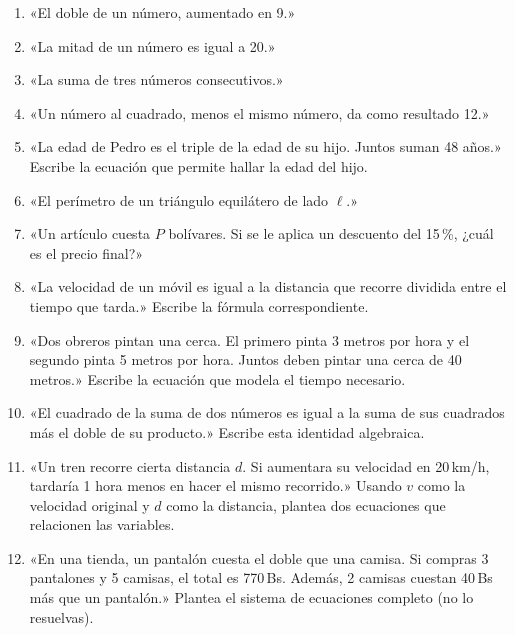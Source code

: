 \documentclass[12pt, a4paper]{article}
\begin{document}
\begin{enumerate}[leftmargin=*, resume]
  \item \facil{} «El doble de un número, aumentado en 9.»

  \item \facil{} «La mitad de un número es igual a 20.»

  \item \facil{} «La suma de tres números consecutivos.»

  \item \facil{} «Un número al cuadrado, menos el mismo número, da como resultado 12.»

  \item \medio{} «La edad de Pedro es el triple de la edad de su hijo. Juntos suman 48 años.» Escribe la ecuación que permite hallar la edad del hijo.

  \item \medio{} «El perímetro de un triángulo equilátero de lado $\ell$.»

  \item \medio{} «Un artículo cuesta $P$ bolívares. Si se le aplica un descuento del 15\,\%, ¿cuál es el precio final?»

  \item \medio{} «La velocidad de un móvil es igual a la distancia que recorre dividida entre el tiempo que tarda.» Escribe la fórmula correspondiente.

  \item \medio{} «Dos obreros pintan una cerca. El primero pinta 3 metros por hora y el segundo pinta 5 metros por hora. Juntos deben pintar una cerca de 40 metros.» Escribe la ecuación que modela el tiempo necesario.

  \item \dificil{} «El cuadrado de la suma de dos números es igual a la suma de sus cuadrados más el doble de su producto.» Escribe esta identidad algebraica.

  \item \dificil{} «Un tren recorre cierta distancia $d$. Si aumentara su velocidad en 20\,km/h, tardaría 1 hora menos en hacer el mismo recorrido.» Usando $v$ como la velocidad original y $d$ como la distancia, plantea dos ecuaciones que relacionen las variables.

  \item \dificil{} «En una tienda, un pantalón cuesta el doble que una camisa. Si compras 3 pantalones y 5 camisas, el total es 770\,Bs. Además, 2 camisas cuestan 40\,Bs más que un pantalón.» Plantea el sistema de ecuaciones completo (no lo resuelvas).
\end{enumerate}
\end{document}
